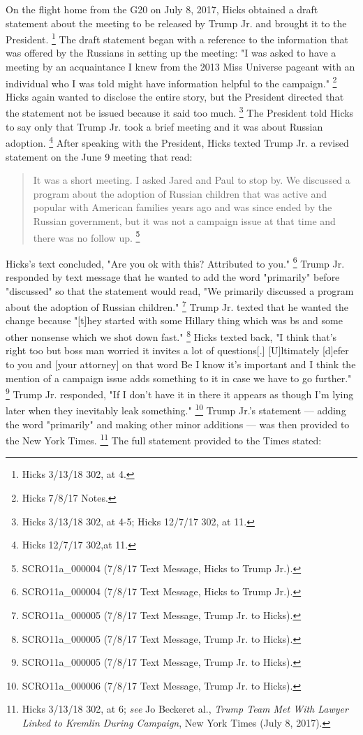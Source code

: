 On the flight home from the G20 on July 8, 2017, Hicks obtained a draft statement about the meeting to be released by Trump Jr. and brought it to the President.%
\footnote{Hicks 3/13/18 302, at 4.}
The draft statement began with a reference to the information that was offered by the Russians in setting up the meeting: "I was asked to have a meeting by an acquaintance I knew from the 2013 Miss Universe pageant with an individual who I was told might have information helpful to the campaign."%
\footnote{Hicks 7/8/17 Notes.}
Hicks again wanted to disclose the entire story, but the President directed that the statement not be
issued because it said too much.%
\footnote{Hicks 3/13/18 302, at 4-5;
Hicks 12/7/17 302, at 11.}
The President told Hicks to say only that Trump Jr. took a brief meeting and it was about Russian adoption.%
\footnote{Hicks 12/7/17 302,at 11.}
After speaking with the President, Hicks texted Trump Jr. a revised statement on the June 9 meeting that read:

\begin{quote}
It was a short meeting.
I asked Jared and Paul to stop by.
We discussed a program about the adoption of Russian children that was active and popular with American families years ago and was since ended by the Russian government, but it was not a campaign issue at that time and there was no follow up.%
\footnote{SCRO11a\_000004 (7/8/17 Text Message, Hicks to Trump Jr.).}
\end{quote}

Hicks's text concluded, "Are you ok with this? Attributed to you."%
\footnote{SCRO11a\_000004 (7/8/17 Text Message, Hicks to Trump Jr.).}
Trump Jr. responded by text message that he wanted to add the word "primarily" before "discussed" so that the statement would read, "We primarily discussed a program about the adoption of Russian children."%
\footnote{SCRO11a\_000005 (7/8/17 Text Message, Trump Jr. to Hicks).}
Trump Jr. texted that he wanted the change because "[t]hey started with some Hillary thing which was bs and some other nonsense which we shot down fast."%
\footnote{SCRO11a\_000005 (7/8/17 Text Message, Trump Jr. to Hicks).}
Hicks texted back, "I think that's right too but boss man worried it invites a lot of questions[.]
[U]ltimately [d]efer to you and [your attorney] on that word Be I know it's important and I think the mention of a campaign issue adds something to it in case we have to go further."%
\footnote{SCRO11a\_000005 (7/8/17 Text Message, Trump Jr. to Hicks).}
Trump Jr. responded, "If I don't have it in there it appears as though I'm lying later when they inevitably leak something."%
\footnote{SCRO11a\_000006 (7/8/17 Text Message, Trump Jr. to Hicks).}
Trump Jr.'s statement — adding the word "primarily" and making other minor additions — was then provided to the New York Times.%
\footnote{Hicks 3/13/18 302, at 6;
\textit{see} Jo Beckeret al., \textit{Trump Team Met With Lawyer Linked to Kremlin During Campaign}, New York Times (July 8, 2017).}
The full statement provided to the Times stated:

